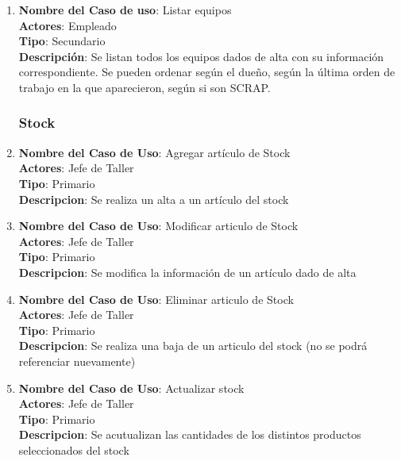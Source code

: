 \documentclass[12pt]{extarticle}
\begin{document}
\begin{spacing}{1.2}
\begin{enumerate}
        \item 	\textbf{Nombre del Caso de uso}: Listar equipos\\
                \textbf{Actores}: Empleado\\
                \textbf{Tipo}: Secundario\\
                \textbf{Descripción}: Se listan todos los equipos dados de alta con su información correspondiente. Se pueden ordenar según el dueño, según la última orden de trabajo en la que aparecieron, según si son SCRAP.



        \subsubsection{Stock}



        \item 	\textbf{Nombre del Caso de Uso}: Agregar artículo de Stock\\
                \textbf{Actores}: Jefe de Taller\\
                \textbf{Tipo}: Primario\\
                \textbf{Descripcion}: Se realiza un alta a un artículo del stock

        \item 	\textbf{Nombre del Caso de Uso}: Modificar articulo de Stock\\
                \textbf{Actores}: Jefe de Taller\\
                \textbf{Tipo}: Primario\\
                \textbf{Descripcion}: Se modifica la información de un artículo dado de alta

        \item 	\textbf{Nombre del Caso de Uso}: Eliminar articulo de Stock\\
                \textbf{Actores}: Jefe de Taller\\
                \textbf{Tipo}: Primario\\
                \textbf{Descripcion}: Se realiza una baja de un articulo del stock (no se podrá referenciar nuevamente)

        \item 	\textbf{Nombre del Caso de Uso}: Actualizar stock\\
                \textbf{Actores}: Jefe de Taller\\
                \textbf{Tipo}: Primario\\
                \textbf{Descripcion}: Se acutualizan las cantidades de los distintos productos seleccionados del stock


\end{enumerate}
\end{spacing}
\end{document}
